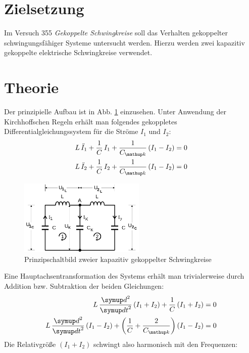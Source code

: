 \setcounter{page}{1}
\section*{Zielsetzung}
Im Versuch 355 \emph{Gekoppelte Schwingkreise} soll das Verhalten gekoppelter schwingungsfähiger Systeme untersucht werden. Hierzu
werden zwei kapazitiv gekoppelte elektrische Schwingkreise verwendet.
\section{Theorie}
Der prinzipielle Aufbau ist in Abb. \ref{fig: prinz_schwingkreis} einzusehen. Unter Anwendung der Kirchhoffschen Regeln erhält man folgendes gekoppletes
Differentialgleichungssystem für die Ströme $I_1$ und $I_2$:
\begin{align}
\begin{aligned}
L \, \ddot{I}_1 + \frac{1}{C} \, I_1 + \frac{1}{C\ua{k}} \left(I_1 - I_2 \right) &= 0 \\
L \, \ddot{I}_2 + \frac{1}{C} \, I_2 + \frac{1}{C\ua{k}} \left(I_1 - I_2 \right) &= 0 \\
\end{aligned}
\end{align}

\begin{figure}
  \centering
  \includegraphics[width = 6cm]{pics/prinzip_schwingkreis.png}
  \caption{Prinzipschaltbild zweier kapazitiv gekoppelter Schwingkreise \cite{anleitung355}}
  \label{fig: prinz_schwingkreis}
\end{figure}

Eine Hauptachsentransformation des Systems erhält man trivialerweise durch Addition bzw. %
Subtraktion der beiden Gleichungen:
\begin{align}
\begin{aligned}
  L\,\frac{\dif{}^2}{\dif{t}^2} \left( I_1 + I_2 \right) + \frac{1}{C} \left( I_1 + I_2 \right) &= 0 \\
  L\,\frac{\dif{}^2}{\dif{t}^2} \left( I_1 - I_2 \right) + \left(\frac{1}{C} + \frac{2}{C\ua{k}}\right) \left( I_1 - I_2 \right) &= 0 \\
  \label{eq: gekoppeltes_lgs}
\end{aligned}
\end{align}
Die Relativgröße $\left( I_1 + I_2 \right)$ schwingt also harmonisch mit den Frequenzen:

